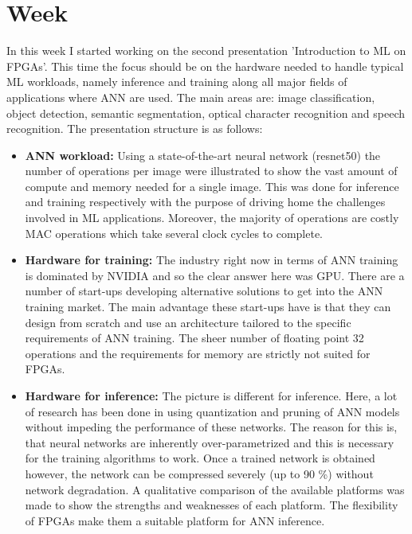 \chapter{Week}
In this week I started working on the second presentation 'Introduction to \ac{ML} on \acp{FPGA}'. This time the focus should be on the hardware needed to handle typical \ac{ML} workloads, namely inference and training along all major fields of applications where \ac{ANN} are used. The main areas are: image classification, object detection, semantic segmentation, optical character recognition and speech recognition. The presentation structure is as follows:
\begin{itemize}
	\item \textbf{\ac{ANN} workload:} Using a state-of-the-art neural network (resnet50) the number of operations per image were illustrated to show the vast amount of compute and memory needed for a single image. This was done for inference and training respectively with the purpose of driving home the challenges involved in \ac{ML} applications. Moreover, the majority of operations are costly \ac{MAC} operations which take several clock cycles to complete.
	\item \textbf{Hardware for training:} The industry right now in terms of \ac{ANN} training is dominated by NVIDIA and so the clear answer here was \ac{GPU}. There are a number of start-ups developing alternative solutions to get into the \ac{ANN} training market. The main advantage these start-ups have is that they can design from scratch and use an architecture tailored to the specific requirements of \ac{ANN} training. The sheer number of floating point 32 operations and the requirements for memory are strictly not suited for \acp{FPGA}.
	\item \textbf{Hardware for inference:} The picture is different for inference. Here, a lot of research has been done in using quantization and pruning of \ac{ANN} models without impeding the performance of these networks. The reason for this is, that neural networks are inherently over-parametrized and this is necessary for the training algorithms to work. Once a trained network is obtained however, the network can be compressed severely (up to 90 \%) without network degradation. A qualitative comparison of the available platforms was made to show the strengths and weaknesses of each platform. The flexibility of \acp{FPGA} make them a suitable platform for \ac{ANN} inference.

\end{itemize}
